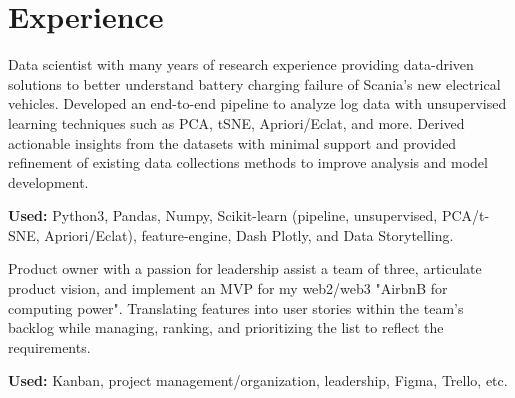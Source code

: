 \documentclass[a4paper]{plushcv}
\begin{document}
\begin{minipage}[t]{0.69\textwidth} 




\section{Experience}
\vspace{\topsep}
\begin{tightemize}
\sectionsep

	\item Data scientist with many years of research experience providing data-driven solutions to better understand battery charging failure of Scania's new electrical vehicles. Developed an end-to-end pipeline to analyze log data with unsupervised learning techniques such as PCA, tSNE, Apriori/Eclat, and more. Derived actionable insights from the datasets with minimal support and provided refinement of existing data collections methods to improve analysis and model development.
	
	\item \textbf{Used:} Python3, Pandas, Numpy, Scikit-learn (pipeline, unsupervised, PCA/t-SNE, Apriori/Eclat), feature-engine, Dash Plotly, and Data Storytelling.\sectionsep
	
\end{tightemize}
\sectionsep
\sectionsep
{}
\begin{tightemize}
\sectionsep

	\item Product owner with a passion for leadership assist a team of three, articulate product vision, and implement an MVP for my web2/web3 "AirbnB for computing power". Translating features into user stories within the team’s backlog while managing, ranking, and prioritizing the list to reflect the requirements.
	
	\item \textbf{Used:} Kanban, project management/organization, leadership,  Figma, Trello, etc.\sectionsep
	
\end{tightemize}
\sectionsep
\sectionsep

\begin{tightemize}
	\sectionsep
	

\end{tightemize}
\end{minipage}
\end{document}
